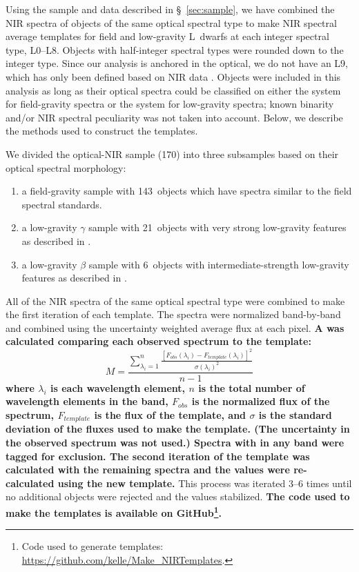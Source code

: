 \documentclass[modern,trackchanges]{aastex61}
\newcommand{\sample}{170}
\newcommand{\optField}{143}
\newcommand{\optBeta}{6}
\newcommand{\optGamma}{21}
\begin{document}
Using the sample and data described in \S~\ref{sec:sample}, we have combined the NIR spectra of objects of the same optical spectral type to make NIR spectral average templates for field and low-gravity L~dwarfs at each integer spectral type, L0--L8. Objects with half-integer spectral types were rounded down to the integer type.
Since our analysis is anchored in the optical, we do not have an L9, which has only been defined based on NIR data \citep{K99,Geballe02}.
Objects were included in this analysis as long as their optical spectra could be classified on either the \citet{K99} system for field-gravity spectra or the \citet{Cruz09_lowg} system for low-gravity spectra; known binarity and/or NIR spectral peculiarity was not taken into account.
Below, we describe the methods used to construct the templates.

We divided the optical-NIR sample (\sample) into three subsamples based on their optical spectral morphology:
\begin{enumerate}
	\item a field-gravity sample with \optField~objects which have spectra similar to the \citet{K99} field spectral standards.
	\item a low-gravity $\gamma$ sample with \optGamma~objects with very strong low-gravity features as described in \citet{Cruz09_lowg}.
	\item a low-gravity $\beta$ sample with \optBeta~objects with intermediate-strength low-gravity features as described in \citet{Cruz09_lowg}.
\end{enumerate}

All of the NIR spectra of the same optical spectral type were combined to make the first iteration of each template.
The spectra were normalized band-by-band and combined using the uncertainty weighted average flux at each pixel.
\textbf{
A  was calculated comparing each observed spectrum to the template:}
\begin{equation}
M=\frac{\sum_{\lambda_i=1}^{n} \frac{[F_{obs}(\lambda_i) - F_{template}(\lambda_i)]^2}{\sigma(\lambda_i)^2}}{n-1}
\end{equation}
\textbf{where $\lambda_i$ is each wavelength element, $n$ is the total number of wavelength elements in the band, $F_{obs}$ is the normalized flux of the spectrum, $F_{template}$ is the flux of the template, and $\sigma$ is the standard deviation of the fluxes used to make the template. (The uncertainty in the observed spectrum was not used.)
Spectra with  in any band were tagged for exclusion.
The second iteration of the template was calculated with the remaining spectra and the  values were re-calculated using the new template.}
This process was iterated 3--6 times until no additional objects were rejected and the  values stabilized. \textbf{The code used to make the templates is available on GitHub\footnote{Code used to generate templates: \url{https://github.com/kelle/Make_NIRTemplates}.}.}
\end{document}

